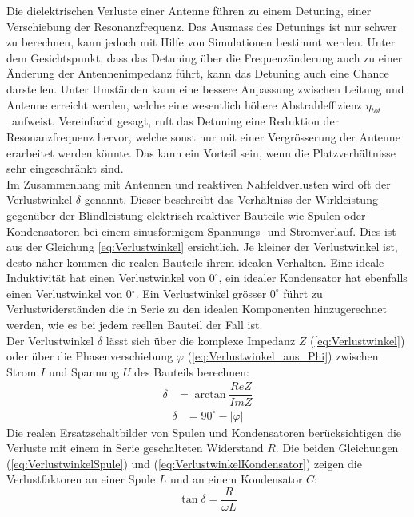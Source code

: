 Die dielektrischen Verluste einer Antenne führen zu einem Detuning, einer Verschiebung der Resonanzfrequenz. Das Ausmass des Detunings ist nur schwer zu berechnen, kann jedoch mit Hilfe von Simulationen bestimmt werden. Unter dem Gesichtspunkt, dass das Detuning über die Frequenzänderung auch zu einer Änderung der Antennenimpedanz führt, kann das Detuning auch eine Chance darstellen. Unter Umständen kann eine bessere Anpassung zwischen Leitung und Antenne erreicht werden, welche eine wesentlich höhere Abstrahleffizienz $\eta_{tot}$ \ aufweist. Vereinfacht gesagt, ruft das Detuning  eine Reduktion der Resonanzfrequenz hervor, welche sonst nur mit einer Vergrösserung der Antenne erarbeitet werden könnte. Das kann ein Vorteil sein, wenn die Platzverhältnisse sehr eingeschränkt sind.\\
Im Zusammenhang mit Antennen und reaktiven Nahfeldverlusten wird oft der Verlustwinkel $\delta$ genannt. Dieser beschreibt das Verhältniss der Wirkleistung gegenüber der Blindleistung elektrisch reaktiver Bauteile wie Spulen oder Kondensatoren bei einem sinusförmigem Spannungs- und Stromverlauf. Dies ist aus der Gleichung \ref{eq:Verlustwinkel} ersichtlich. Je kleiner der Verlustwinkel ist, desto näher kommen die realen Bauteile ihrem idealen Verhalten. Eine ideale Induktivität hat einen Verlustwinkel von $0^\circ$, ein idealer Kondensator hat ebenfalls einen Verlustwinkel von 0$^\circ$. Ein Verlustwinkel grösser $0^\circ$ führt zu Verlustwiderständen die in Serie zu den idealen Komponenten hinzugerechnet werden, wie es bei jedem reellen Bauteil der Fall ist.\\
Der Verlustwinkel $\delta$ lässt sich über die komplexe Impedanz $Z$ (\ref{eq:Verlustwinkel}) oder über die Phasenverschiebung $\varphi$ (\ref{eq:Verlustwinkel_aus_Phi}) zwischen Strom $I$ und Spannung $U$ des Bauteils berechnen: 
\begin{align}
\label{eq:Verlustwinkel}
\delta &= \arctan \dfrac{ReZ}{ImZ}
\end{align}
\begin{align}
\label{eq:Verlustwinkel_aus_Phi}
\delta &= 90^\circ - |\varphi|
\end{align}
Die realen Ersatzschaltbilder von Spulen und Kondensatoren berücksichtigen die Verluste mit einem in Serie geschalteten Widerstand $R$. Die beiden Gleichungen (\ref{eq:VerlustwinkelSpule}) und (\ref{eq:VerlustwinkelKondensator}) zeigen die Verlustfaktoren an einer Spule $L$ und an einem Kondensator $C$:
\begin{equation}\label{eq:VerlustwinkelSpule}
\tan \delta = \dfrac{R}{\omega L}
\end{equation}
